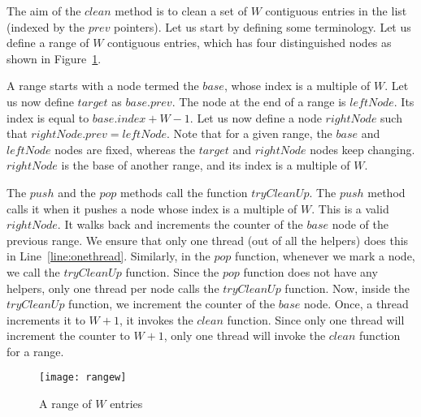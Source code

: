 \documentclass{llncs}
\begin{document}
The aim of the $clean$ method is to clean a set of $W$ contiguous entries in the list (indexed by 
the $prev$ pointers). Let us start by defining some terminology. Let us define a range of $W$ 
contiguous entries, which has four distinguished nodes as shown in Figure~\ref{fig:rangew}.

A range starts with a node termed the $base$, whose index is a multiple of $W$. Let us now define
$target$ as $base.prev$. The node at the end of a range is $leftNode$. Its index is equal to 
$base.index + W - 1$. Let us now define a node $rightNode$ such that $rightNode.prev = leftNode$. 
Note that for a given range, the $base$ and $leftNode$ nodes are fixed, whereas the $target$ and
$rightNode$ nodes keep changing. $rightNode$ is the base of another range, and its index is
a multiple of $W$. 

The $push$ and the $pop$ methods call the function $tryCleanUp$. The $push$ method calls it when
it pushes a node whose index is a multiple of $W$. This is a valid $rightNode$. It walks back 
and increments the counter of the $base$ node of the previous range. We ensure that only one thread
(out of all the helpers) does this in Line~\ref{line:onethread}. Similarly, in the $pop$ function,
whenever we mark a node, we call the $tryCleanUp$ function. Since the $pop$ function does not
have any helpers, only one thread per node calls the $tryCleanUp$ function. Now, inside
the $tryCleanUp$ function, we increment the counter of the $base$ node. Once, a thread increments it to 
$W+1$, it invokes the $clean$ function. Since only one thread will increment the counter to $W+1$, 
only one thread will invoke the $clean$ function for a range. 
\vspace{-4mm}
\begin{figure}[!htb]
\begin{center}
\texttt{[image: rangew]}
\caption{A range of $W$ entries \label{fig:rangew} }
\end{center}
\end{figure}
\vspace{-8mm}
\end{document}
